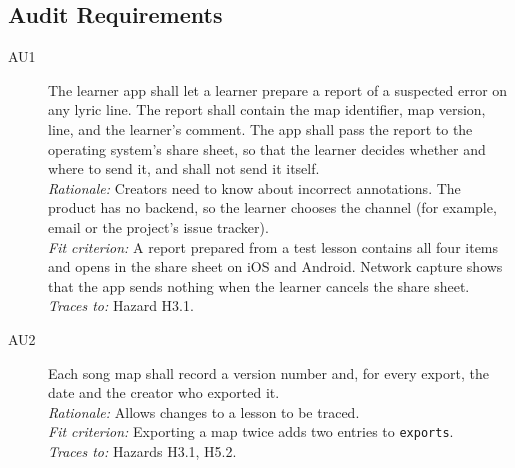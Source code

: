 \documentclass[12pt]{article}
\newcommand{\rat}[1]{\\\textit{Rationale:} #1}
\newcommand{\fit}[1]{\\\textit{Fit criterion:} #1}
\newcommand{\trace}[1]{\\\textit{Traces to:} #1}
\newcommand{\reqdef}[1]{\hypertarget{req:#1}{#1}}
\begin{document}
\subsection{Audit Requirements}
\begin{description}
\item[\reqdef{AU1}] The learner app shall let a learner prepare a report of a suspected
error on any lyric line. The report shall contain the map identifier, map
version, line, and the learner's comment. The app shall pass the report to the
operating system's share sheet, so that the learner decides whether and where
to send it, and shall not send it itself.
\rat{Creators need to know about incorrect annotations. The product has no
backend, so the learner chooses the channel (for example, email or the
project's issue tracker).}
\fit{A report prepared from a test lesson contains all four items and opens in
the share sheet on iOS and Android. Network capture shows that the app sends
nothing when the learner cancels the share sheet.}
\trace{Hazard H3.1.}

\item[\reqdef{AU2}] Each song map shall record a version number and, for every export,
the date and the creator who exported it.
\rat{Allows changes to a lesson to be traced.}
\fit{Exporting a map twice adds two entries to \texttt{exports}.}
\trace{Hazards H3.1, H5.2.}
\end{description}
\end{document}
